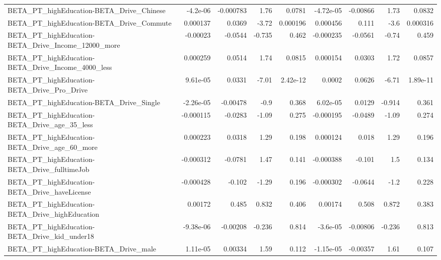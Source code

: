 \begin{tabular}{lrrrrrrrr}
BETA\_PT\_highEducation-BETA\_Drive\_Chinese           &    -4.2e-06 &    -0.000783 &      1.76 &   0.0781 &  -4.72e-05 &    -0.00866 &         1.73 &        0.0832 \\
BETA\_PT\_highEducation-BETA\_Drive\_Commute           &    0.000137 &       0.0369 &     -3.72 & 0.000196 &   0.000456 &       0.111 &         -3.6 &      0.000316 \\
BETA\_PT\_highEducation-BETA\_Drive\_Income\_12000\_more &    -0.00023 &      -0.0544 &    -0.735 &    0.462 &  -0.000235 &     -0.0561 &        -0.74 &         0.459 \\
BETA\_PT\_highEducation-BETA\_Drive\_Income\_4000\_less  &    0.000259 &       0.0514 &      1.74 &   0.0815 &   0.000154 &      0.0303 &         1.72 &        0.0857 \\
BETA\_PT\_highEducation-BETA\_Drive\_Pro\_Drive         &    9.61e-05 &       0.0331 &     -7.01 & 2.42e-12 &     0.0002 &      0.0626 &        -6.71 &      1.89e-11 \\
BETA\_PT\_highEducation-BETA\_Drive\_Single            &   -2.26e-05 &     -0.00478 &      -0.9 &    0.368 &   6.02e-05 &      0.0129 &       -0.914 &         0.361 \\
BETA\_PT\_highEducation-BETA\_Drive\_age\_35\_less       &   -0.000115 &      -0.0283 &     -1.09 &    0.275 &  -0.000195 &     -0.0489 &        -1.09 &         0.274 \\
BETA\_PT\_highEducation-BETA\_Drive\_age\_60\_more       &    0.000223 &       0.0318 &      1.29 &    0.198 &   0.000124 &       0.018 &         1.29 &         0.196 \\
BETA\_PT\_highEducation-BETA\_Drive\_fulltimeJob       &   -0.000312 &      -0.0781 &      1.47 &    0.141 &  -0.000388 &      -0.101 &          1.5 &         0.134 \\
BETA\_PT\_highEducation-BETA\_Drive\_haveLicense       &   -0.000428 &       -0.102 &     -1.29 &    0.196 &  -0.000302 &     -0.0644 &         -1.2 &         0.228 \\
BETA\_PT\_highEducation-BETA\_Drive\_highEducation     &     0.00172 &        0.485 &     0.832 &    0.406 &    0.00174 &       0.508 &        0.872 &         0.383 \\
BETA\_PT\_highEducation-BETA\_Drive\_kid\_under18       &   -9.38e-06 &     -0.00208 &    -0.236 &    0.814 &   -3.6e-05 &    -0.00806 &       -0.236 &         0.813 \\
BETA\_PT\_highEducation-BETA\_Drive\_male              &    1.11e-05 &      0.00334 &      1.59 &    0.112 &  -1.15e-05 &    -0.00357 &         1.61 &         0.107 \\

\end{tabular}
